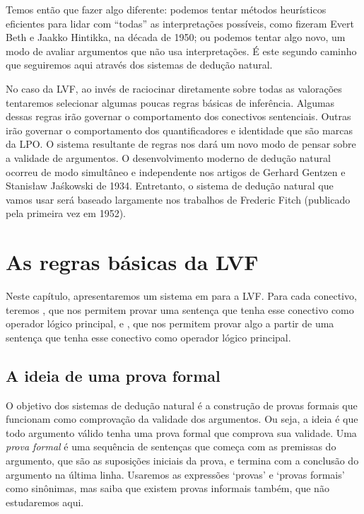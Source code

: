 Temos então que fazer algo diferente: podemos tentar métodos heurísticos eficientes para lidar com ``todas'' as interpretações possíveis, como fizeram Evert Beth e Jaakko Hintikka, na década de 1950;  ou podemos tentar algo novo, um modo de avaliar argumentos que não usa interpretações.
É este segundo caminho que seguiremos aqui através dos sistemas de dedução natural.
 
No caso da LVF, ao invés de raciocinar diretamente sobre todas as valorações tentaremos selecionar algumas poucas regras básicas de inferência.  Algumas dessas regras  irão governar o comportamento dos conectivos sentenciais. Outras irão governar o comportamento dos quantificadores e identidade que são marcas da LPO.  
O sistema resultante de regras nos dará um novo modo de pensar sobre a validade de argumentos.  O desenvolvimento moderno de dedução natural ocorreu de modo simultâneo e independente nos artigos de Gerhard Gentzen e Stanis\l{}aw Ja\'{s}kowski de 1934.  Entretanto, o sistema de dedução natural que vamos usar  será  baseado largamente nos trabalhos de Frederic Fitch (publicado pela primeira vez em 1952). 

\chapter{As regras básicas da LVF}\label{s:BasicTFL}

 

Neste capítulo,  apresentaremos um sistema em   para a LVF. Para cada conectivo, teremos  ,  que nos permitem provar uma sentença que tenha esse conectivo como operador lógico principal, e , que nos permitem provar algo a partir de uma sentença que tenha esse conectivo como operador lógico principal. 


\section{A  ideia de uma prova formal}
 

O objetivo dos sistemas de dedução natural é a construção de provas formais que funcionam como comprovação da validade dos argumentos. Ou seja, a ideia é que todo argumento válido tenha uma prova formal que comprova sua validade. Uma \emph{prova formal} é uma sequência de sentenças que começa com as premissas do argumento, que são as suposições iniciais da prova, e termina com a conclusão do argumento na última linha. Usaremos as expressões `provas' e `provas formais' como sinônimas, mas saiba que existem provas informais também, que não estudaremos aqui.

